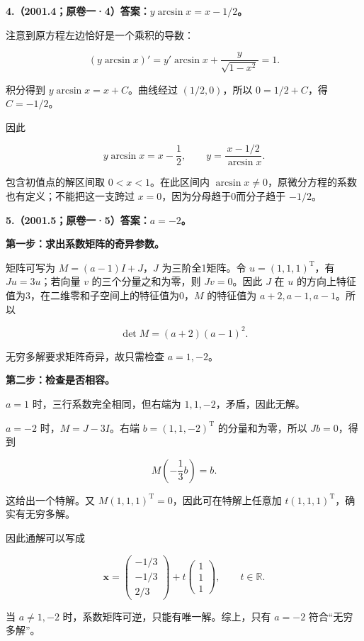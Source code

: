 \documentclass[UTF8,11pt,fontset=windows]{ctexart}
\begin{document}
\clearpage

\textbf{4.（2001.4；原卷一·4）答案：$y\arcsin x=x-1/2$。}

注意到原方程左边恰好是一个乘积的导数：

$$
(y\arcsin x)'=y'\arcsin x+\frac y{\sqrt{1-x^2}}=1.
$$

积分得到 $y\arcsin x=x+C$。曲线经过 $(1/2,0)$，所以 $0=1/2+C$，得 $C=-1/2$。

因此

$$
y\arcsin x=x-\frac12,
\qquad y=\frac{x-1/2}{\arcsin x}.
$$

包含初值点的解区间取 $0<x<1$。在此区间内 $\arcsin x\ne0$，原微分方程的系数也有定义；不能把这一支跨过 $x=0$，因为分母趋于0而分子趋于 $-1/2$。

\clearpage

\textbf{5.（2001.5；原卷一·5）答案：$a=-2$。}

\textbf{第一步：求出系数矩阵的奇异参数。}

矩阵可写为 $M=(a-1)I+J$，$J$ 为三阶全1矩阵。令 $u=(1,1,1)^{\mathrm T}$，有 $Ju=3u$；若向量 $v$ 的三个分量之和为零，则 $Jv=0$。因此 $J$ 在 $u$ 的方向上特征值为3，在二维零和子空间上的特征值为0，$M$ 的特征值为 $a+2,a-1,a-1$。所以

$$
\det M=(a+2)(a-1)^2.
$$

无穷多解要求矩阵奇异，故只需检查 $a=1,-2$。

\textbf{第二步：检查是否相容。}

$a=1$ 时，三行系数完全相同，但右端为 $1,1,-2$，矛盾，因此无解。

$a=-2$ 时，$M=J-3I$。右端 $b=(1,1,-2)^{\mathrm T}$ 的分量和为零，所以 $Jb=0$，得到

$$
M\left(-\frac13b\right)=b.
$$

这给出一个特解。又 $M(1,1,1)^{\mathrm T}=0$，因此可在特解上任意加 $t(1,1,1)^{\mathrm T}$，确实有无穷多解。

因此通解可以写成

$$
\boldsymbol x=\begin{pmatrix}-1/3\\-1/3\\2/3\end{pmatrix}
+t\begin{pmatrix}1\\1\\1\end{pmatrix},\qquad t\in\mathbb R.
$$

当 $a\ne1,-2$ 时，系数矩阵可逆，只能有唯一解。综上，只有 $\boxed{a=-2}$ 符合“无穷多解”。
\end{document}

